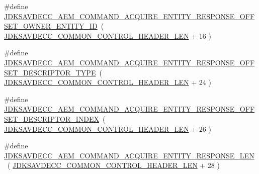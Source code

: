 \begin{DoxyCompactItemize}
\item 
\#define \hyperlink{group__command__acquire__entity__response_ga29f02b5c1e0f6eddb186c3ebf5ce39f9}{J\+D\+K\+S\+A\+V\+D\+E\+C\+C\+\_\+\+A\+E\+M\+\_\+\+C\+O\+M\+M\+A\+N\+D\+\_\+\+A\+C\+Q\+U\+I\+R\+E\+\_\+\+E\+N\+T\+I\+T\+Y\+\_\+\+R\+E\+S\+P\+O\+N\+S\+E\+\_\+\+O\+F\+F\+S\+E\+T\+\_\+\+O\+W\+N\+E\+R\+\_\+\+E\+N\+T\+I\+T\+Y\+\_\+\+ID}~( \hyperlink{group__jdksavdecc__avtp__common__control__header_gaae84052886fb1bb42f3bc5f85b741dff}{J\+D\+K\+S\+A\+V\+D\+E\+C\+C\+\_\+\+C\+O\+M\+M\+O\+N\+\_\+\+C\+O\+N\+T\+R\+O\+L\+\_\+\+H\+E\+A\+D\+E\+R\+\_\+\+L\+EN} + 16 )
\item 
\#define \hyperlink{group__command__acquire__entity__response_gaad3c4269692efc3d5f1a56f855d16ad0}{J\+D\+K\+S\+A\+V\+D\+E\+C\+C\+\_\+\+A\+E\+M\+\_\+\+C\+O\+M\+M\+A\+N\+D\+\_\+\+A\+C\+Q\+U\+I\+R\+E\+\_\+\+E\+N\+T\+I\+T\+Y\+\_\+\+R\+E\+S\+P\+O\+N\+S\+E\+\_\+\+O\+F\+F\+S\+E\+T\+\_\+\+D\+E\+S\+C\+R\+I\+P\+T\+O\+R\+\_\+\+T\+Y\+PE}~( \hyperlink{group__jdksavdecc__avtp__common__control__header_gaae84052886fb1bb42f3bc5f85b741dff}{J\+D\+K\+S\+A\+V\+D\+E\+C\+C\+\_\+\+C\+O\+M\+M\+O\+N\+\_\+\+C\+O\+N\+T\+R\+O\+L\+\_\+\+H\+E\+A\+D\+E\+R\+\_\+\+L\+EN} + 24 )
\item 
\#define \hyperlink{group__command__acquire__entity__response_ga4c62c0b7729a3956c3a123862e46414d}{J\+D\+K\+S\+A\+V\+D\+E\+C\+C\+\_\+\+A\+E\+M\+\_\+\+C\+O\+M\+M\+A\+N\+D\+\_\+\+A\+C\+Q\+U\+I\+R\+E\+\_\+\+E\+N\+T\+I\+T\+Y\+\_\+\+R\+E\+S\+P\+O\+N\+S\+E\+\_\+\+O\+F\+F\+S\+E\+T\+\_\+\+D\+E\+S\+C\+R\+I\+P\+T\+O\+R\+\_\+\+I\+N\+D\+EX}~( \hyperlink{group__jdksavdecc__avtp__common__control__header_gaae84052886fb1bb42f3bc5f85b741dff}{J\+D\+K\+S\+A\+V\+D\+E\+C\+C\+\_\+\+C\+O\+M\+M\+O\+N\+\_\+\+C\+O\+N\+T\+R\+O\+L\+\_\+\+H\+E\+A\+D\+E\+R\+\_\+\+L\+EN} + 26 )
\item 
\#define \hyperlink{group__command__acquire__entity__response_ga0ee21d90137d9e0cd40b74ecff44a5bd}{J\+D\+K\+S\+A\+V\+D\+E\+C\+C\+\_\+\+A\+E\+M\+\_\+\+C\+O\+M\+M\+A\+N\+D\+\_\+\+A\+C\+Q\+U\+I\+R\+E\+\_\+\+E\+N\+T\+I\+T\+Y\+\_\+\+R\+E\+S\+P\+O\+N\+S\+E\+\_\+\+L\+EN}~( \hyperlink{group__jdksavdecc__avtp__common__control__header_gaae84052886fb1bb42f3bc5f85b741dff}{J\+D\+K\+S\+A\+V\+D\+E\+C\+C\+\_\+\+C\+O\+M\+M\+O\+N\+\_\+\+C\+O\+N\+T\+R\+O\+L\+\_\+\+H\+E\+A\+D\+E\+R\+\_\+\+L\+EN} + 28 )
\end{DoxyCompactItemize}

